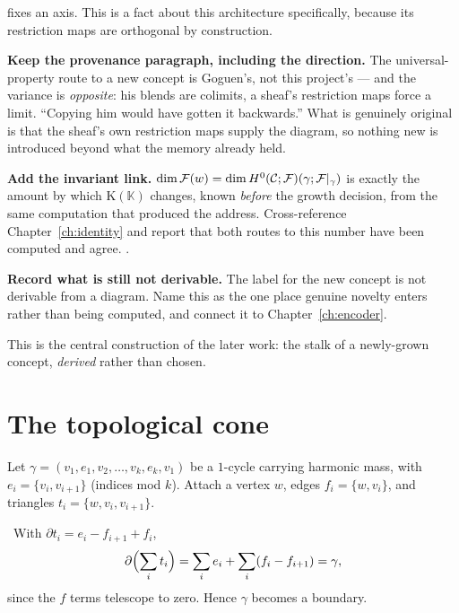 \begin{workplan}{\Keep}
{    fixes an axis. This is a fact about this architecture specifically, because
    its restriction maps are orthogonal by construction.
  \item \textbf{Keep the provenance paragraph, including the direction.} The
    universal-property route to a new concept is Goguen's, not this project's
    --- and the variance is \emph{opposite}: his blends are colimits, a sheaf's
    restriction maps force a limit. ``Copying him would have gotten it
    backwards.'' What is genuinely original is that the sheaf's own restriction
    maps supply the diagram, so nothing new is introduced beyond what the
    memory already held.
  \item \textbf{Add the invariant link.} $\dim\mathcal{F}(w) = \dim H^{0}(\mathcal{C};\mathcal{F})(\gamma;
    \mathcal{F}|_\gamma)$ is exactly the amount by which $\mathrm{K}(\mathbb{K})$
    changes, known \emph{before} the growth decision, from the same
    computation that produced the address. Cross-reference
    Chapter~\ref{ch:identity} and report that both routes to this number have
    been computed and agree. \Measured.
  \item \textbf{Record what is still not derivable.} The label for the new
    concept is not derivable from a diagram. Name this as the one place
    genuine novelty enters rather than being computed, and connect it to
    Chapter~\ref{ch:encoder}.
}

\end{workplan}

This is the central construction of the later work: the stalk of a
newly-grown concept, \emph{derived} rather than chosen.

\section{The topological cone}

\begin{construction}\label{con:conetopo}
Let $\gamma=(v_1,e_1,v_2,\dots,v_k,e_k,v_1)$ be a $1$-cycle carrying
harmonic mass, with $e_i=\{v_i,v_{i+1}\}$ (indices mod $k$). Attach a
vertex $w$, edges $f_i=\{w,v_i\}$, and triangles
$t_i=\{w,v_i,v_{i+1}\}$.
\end{construction}

\begin{proposition}\label{prop:conekills}
\Proved\ With $\partial t_i=e_i-f_{i+1}+f_i$,
\[
  \partial\Bigl(\sum_i t_i\Bigr)
  =\sum_i e_i+\sum_i(f_i-f_{i+1})=\gamma,
\]
since the $f$ terms telescope to zero. Hence $\gamma$ becomes a
boundary.
\end{proposition}

